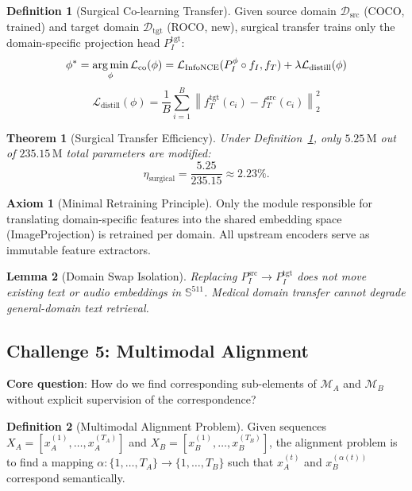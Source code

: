 \documentclass[12pt,a4paper]{article}
\theoremstyle{definition}
\newtheorem{definition}{Definition}[section]
\newtheorem{axiom}{Axiom}[section]
\theoremstyle{plain}
\newtheorem{theorem}{Theorem}[section]
\newtheorem{lemma}[theorem]{Lemma}
\theoremstyle{remark}
\newcommand{\Sph}{\mathbb{S}}
\newcommand{\Norm}[1]{\left\|#1\right\|}
\newcommand{\argmin}{\operatornamewithlimits{arg\,min}}
\newcommand{\MA}{\mathcal{M}_A}
\newcommand{\MB}{\mathcal{M}_B}
\begin{document}
\begin{definition}[Surgical Co-learning Transfer]
\label{def:surgical}
Given source domain $\mathcal{D}_{\text{src}}$ (COCO, trained) and target domain $\mathcal{D}_{\text{tgt}}$ (ROCO, new), surgical transfer trains only the domain-specific projection head $P_I^{\text{tgt}}$:
\[
  \phi^* = \argmin_\phi \mathcal{L}_{\text{co}}(\phi) = \mathcal{L}_{\text{InfoNCE}}(P_I^\phi \circ f_I, f_T) + \lambda \mathcal{L}_{\text{distill}}(\phi)
\]
\[
  \mathcal{L}_{\text{distill}}(\phi) = \frac{1}{B}\sum_{i=1}^B \Norm{f_T^{\text{tgt}}(c_i) - f_T^{\text{src}}(c_i)}_2^2
\]
\end{definition}

\begin{theorem}[Surgical Transfer Efficiency]
Under Definition~\ref{def:surgical}, only $5.25\,\text{M}$ out of $235.15\,\text{M}$ total parameters are modified:
\[
  \eta_{\text{surgical}} = \frac{5.25}{235.15} \approx 2.23\%.
\]
\end{theorem}

\begin{axiom}[Minimal Retraining Principle]
Only the module responsible for translating domain-specific features into the shared embedding space (ImageProjection) is retrained per domain. All upstream encoders serve as immutable feature extractors.
\end{axiom}

\begin{lemma}[Domain Swap Isolation]
Replacing $P_I^{\text{src}} \to P_I^{\text{tgt}}$ does not move existing text or audio embeddings in $\Sph^{511}$. Medical domain transfer cannot degrade general-domain text retrieval.
\end{lemma}

\subsection{Challenge 5: Multimodal Alignment}

\begin{tcolorbox}[challengebox,title={Challenge 5: Alignment}]
\textbf{Core question}: How do we find corresponding sub-elements of $\MA$ and $\MB$ without explicit supervision of the correspondence?
\end{tcolorbox}

\begin{definition}[Multimodal Alignment Problem]
Given sequences $X_A = [x_A^{(1)},\ldots,x_A^{(T_A)}]$ and $X_B = [x_B^{(1)},\ldots,x_B^{(T_B)}]$, the alignment problem is to find a mapping $\alpha : \{1,\ldots,T_A\} \to \{1,\ldots,T_B\}$ such that $x_A^{(t)}$ and $x_B^{(\alpha(t))}$ correspond semantically.
\end{definition}
\end{document}
